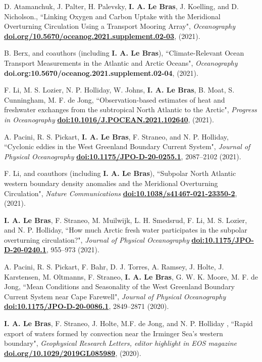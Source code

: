 \documentclass[paper=letter,fontsize=11pt]{scrartcl} %
\newcommand{\PaperEntry}[6]{
		\noindent #1, ``#2", \textit{#3} \textbf{#4}, #5 (#6).}
\begin{document}
\begin{etaremune}
\item \PaperEntry{D. Atamanchuk, J. Palter, H. Palevsky, \textbf{I. A. Le Bras}, J. Koelling, and D. Nicholson.}{Linking Oxygen and Carbon Uptake with the Meridional Overturning Circulation Using a Transport Mooring Array}{Oceanography}{\url{doi.org/10.5670/oceanog.2021.supplement.02-03}}{}{2021}

\item \PaperEntry{B. Berx, and coauthors (including \textbf{I. A. Le Bras})}{Climate-Relevant Ocean Transport Measurements in the Atlantic and Arctic Oceans}{Oceanography}{doi.org:10.5670/oceanog.2021.supplement.02-04}{}{2021}

\item \PaperEntry{F. Li, M. S. Lozier, N. P. Holliday, W. Johns, \textbf{I. A. Le Bras}, B. Moat, S. Cunningham, M. F. de Jong}{Observation-based estimates of heat and freshwater exchanges from the subtropical North Atlantic to the Arctic}{Progress in Oceanography}{\url{doi:10.1016/J.POCEAN.2021.102640}}{}{2021}

\item \PaperEntry{A. Pacini, R. S. Pickart, \textbf{I. A. Le Bras}, F. Straneo, and N. P. Holliday}{Cyclonic eddies in the West Greenland Boundary Current System}{Journal of Physical Oceanography}{\url{doi:10.1175/JPO-D-20-0255.1}}{2087--2102}{2021}


\item \PaperEntry{F. Li, and coauthors (including \textbf{I. A. Le Bras})}{Subpolar North Atlantic western boundary density anomalies and the Meridional Overturning Circulation}{Nature Communications}{\url{doi:10.1038/s41467-021-23350-2}}{}{2021}
\item \PaperEntry{\textbf{I. A. Le Bras}, F. Straneo, M. Muilwijk, L. H. Smedsrud, F. Li, M. S. Lozier, and N. P. Holliday}{How much Arctic fresh water participates in the subpolar overturning circulation?}{Journal of Physical Oceanography}{\url{doi:10.1175/JPO-D-20-0240.1}}{955--973}{2021}

\item \PaperEntry{A. Pacini, R. S. Pickart, F. Bahr, D. J. Torres, A. Ramsey, J. Holte, J. Karstensen, M. Oltmanns, F. Straneo, \textbf{I. A. Le Bras}, G. W. K. Moore, M. F. de Jong}{Mean Conditions and Seasonality of the West Greenland Boundary Current System near Cape Farewell}{Journal of Physical Oceanography}{\url{doi:10.1175/JPO-D-20-0086.1}}{2849--2871}{2020}

\item \PaperEntry{\textbf{I. A. Le Bras}, F. Straneo, J. Holte, M.F. de Jong, and N. P. Holliday }{Rapid export of waters formed by convection near the Irminger Sea's western boundary}{Geophysical Research Letters, editor highlight in EOS magazine}{\url{doi.org/10.1029/2019GL085989}}{}{2020}


\end{etaremune}
\end{document}
